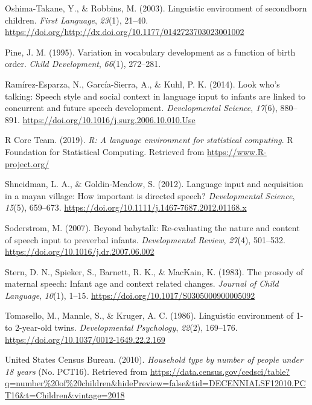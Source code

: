 \documentclass[
  english,
  man,floatsintext]{apa6}
\begin{document}
\leavevmode\hypertarget{ref-oshima-takane_linguistic_2003}{}%
Oshima-Takane, Y., \& Robbins, M. (2003). Linguistic environment of secondborn children. \emph{First Language}, \emph{23}(1), 21--40. \url{https://doi.org/http://dx.doi.org/10.1177/0142723703023001002}

\leavevmode\hypertarget{ref-pine_variation_1995}{}%
Pine, J. M. (1995). Variation in vocabulary development as a function of birth order. \emph{Child Development}, \emph{66}(1), 272--281.

\leavevmode\hypertarget{ref-ramirez-esparza_look_2014}{}%
Ramírez-Esparza, N., García-Sierra, A., \& Kuhl, P. K. (2014). Look who's talking: Speech style and social context in language input to infants are linked to concurrent and future speech development. \emph{Developmental Science}, \emph{17}(6), 880--891. \url{https://doi.org/10.1016/j.surg.2006.10.010.Use}

\leavevmode\hypertarget{ref-r_core_team_r_2019}{}%
R Core Team. (2019). \emph{R: A language environment for statistical computing}. R Foundation for Statistical Computing. Retrieved from \url{https://www.R-project.org/}

\leavevmode\hypertarget{ref-shneidman_language_2012}{}%
Shneidman, L. A., \& Goldin‐Meadow, S. (2012). Language input and acquisition in a mayan village: How important is directed speech? \emph{Developmental Science}, \emph{15}(5), 659--673. \url{https://doi.org/10.1111/j.1467-7687.2012.01168.x}

\leavevmode\hypertarget{ref-soderstrom_beyond_2007}{}%
Soderstrom, M. (2007). Beyond babytalk: Re-evaluating the nature and content of speech input to preverbal infants. \emph{Developmental Review}, \emph{27}(4), 501--532. \url{https://doi.org/10.1016/j.dr.2007.06.002}

\leavevmode\hypertarget{ref-stern_prosody_1983}{}%
Stern, D. N., Spieker, S., Barnett, R. K., \& MacKain, K. (1983). The prosody of maternal speech: Infant age and context related changes. \emph{Journal of Child Language}, \emph{10}(1), 1--15. \url{https://doi.org/10.1017/S0305000900005092}

\leavevmode\hypertarget{ref-tomasello_linguistic_1986}{}%
Tomasello, M., Mannle, S., \& Kruger, A. C. (1986). Linguistic environment of 1- to 2-year-old twins. \emph{Developmental Psychology}, \emph{22}(2), 169--176. \url{https://doi.org/10.1037/0012-1649.22.2.169}

\leavevmode\hypertarget{ref-united_states_census_bureau_household_2010}{}%
United States Census Bureau. (2010). \emph{Household type by number of people under 18 years} (No. PCT16). Retrieved from \url{https://data.census.gov/cedsci/table?q=number\%20of\%20children\&hidePreview=false\&tid=DECENNIALSF12010.PCT16\&t=Children\&vintage=2018}
\end{document}
